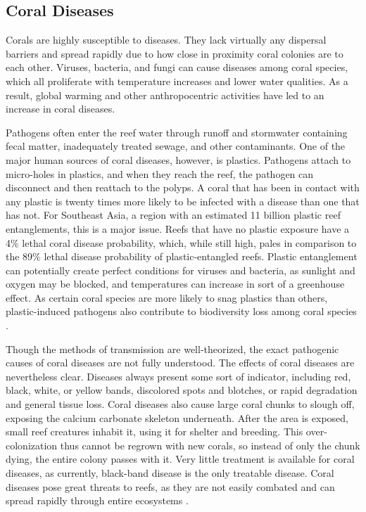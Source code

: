 \documentclass{book}\usepackage{knitr}
\begin{document}
\begin{knitrout}
\begin{kframe}
\subsection{Coral Diseases}\label{sub:cd}

Corals are highly susceptible to diseases. They lack virtually any dispersal barriers and spread rapidly due to how close in proximity coral colonies are to each other. Viruses, bacteria, and fungi can cause diseases among coral species, which all proliferate with temperature increases and lower water qualities. As a result, global warming and other anthropocentric activities have led to an increase in coral diseases\citep{Keller2009ClimateCC}. 

Pathogens often enter the reef water through runoff and stormwater containing fecal matter, inadequately treated sewage, and other contaminants. One of the major human sources of coral diseases, however, is plastics. Pathogens attach to micro-holes in plastics, and when they reach the reef, the pathogen can disconnect and then reattach to the polyps. A coral that has been in contact with any plastic is twenty times more likely to be infected with a disease than one that has not. For Southeast Asia, a region with an estimated 11 billion plastic reef entanglements, this is a major issue. Reefs that have no plastic exposure have a 4\% lethal coral disease probability, which, while still high, pales in comparison to the 89\% lethal disease probability of plastic-entangled reefs. Plastic entanglement can potentially create perfect conditions for viruses and bacteria, as sunlight and oxygen may be blocked, and temperatures can increase in sort of a greenhouse effect. As certain coral species are more likely to snag plastics than others, plastic-induced pathogens also contribute to biodiversity loss among coral species \citep{Thompson}.

Though the methods of transmission are well-theorized, the exact pathogenic causes of coral diseases are not fully understood. The effects of coral diseases are nevertheless clear. Diseases always present some sort of indicator, including red, black, white, or yellow bands, discolored spots and blotches, or rapid degradation and general tissue loss. Coral diseases also cause large coral chunks to slough off, exposing the calcium carbonate skeleton underneath. After the area is exposed, small reef creatures inhabit it, using it for shelter and breeding. This over-colonization thus cannot be regrown with new corals, so instead of only the chunk dying, the entire colony passes with it. Very little treatment is available for coral diseases, as currently, black-band disease is the only treatable disease. Coral diseases pose great threats to reefs, as they are not easily combated and can spread rapidly through entire ecosystems \citep{coraldiseasenoaa}.


\end{kframe}
\end{knitrout}
\end{document}
